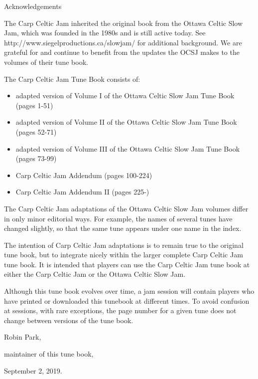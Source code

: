 \documentclass[10pt,fleqn]{article}
\begin{document}
\pagestyle{empty}
\setlength{\parindent}{0pt}
\setlength{\parskip}{1em}
\begin{center}
\LARGE
Acknowledgements
\normalsize
\end{center}

The Carp Celtic Jam inherited the original book from the Ottawa Celtic Slow Jam, which was founded in the 1980s and is still active today.  See http://www.siegelproductions.ca/slowjam/ for additional background.  We are grateful for and continue to benefit from the updates the OCSJ makes to the volumes of their tune book.

The Carp Celtic Jam Tune Book consists of:
\begin{itemize}
\item adapted version of Volume I of the Ottawa Celtic Slow Jam Tune Book (pages 1-51)
\item adapted version of Volume II of the Ottawa Celtic Slow Jam Tune Book (pages 52-71)
\item adapted version of Volume III of the Ottawa Celtic Slow Jam Tune Book (pages 73-99)
\item Carp Celtic Jam Addendum (pages 100-224)
\item Carp Celtic Jam Addendum II (pages 225-)
\end{itemize}

The Carp Celtic Jam adaptations of the Ottawa Celtic Slow Jam volumes differ in only minor editorial ways.  For example, the names of several tunes have changed slightly, so that the same tune appears under one name in the index.

The intention of Carp Celtic Jam adaptations is to remain true to the original tune book, but to integrate nicely within the larger complete Carp Celtic Jam tune book.  It is intended that players can use the Carp Celtic Jam tune book at either the Carp Celtic Jam or the Ottawa Celtic Slow Jam.

Although this tune book evolves over time, a jam session will contain players who have printed or downloaded this tunebook at different times.  To avoid confusion at sessions, with rare exceptions, the page number for a given tune does not change between versions of the tune book.

\begin{flushright}
\setlength{\parskip}{0pt}
Robin Park,

maintainer of this tune book,

September 2, 2019.
\end{flushright}
\end{document}
